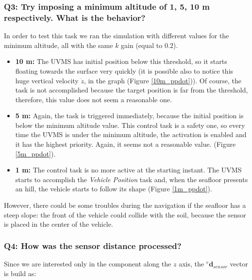 \documentclass{article}
\begin{document}

\subsubsection{Q3: Try imposing a minimum altitude of 1, 5, 10 m respectively. What is the behavior?}
In order to test this task we ran the simulation with different values for the minimum altitude, all with the same $k$ gain (equal to $0.2$).

\begin{itemize}
    \item \textbf{10 m:} The UVMS has initial position below this threshold, so it starts floating towards the surface very quickly (it is possible also to notice this huge vertical velocity $\dot{z}$, in the graph (Figure \ref{10m_ppdot})). 
    Of course, the task is not accomplished because the target position is far from the threshold, therefore, this value does not seem a reasonable one. %
    \item \textbf{5 m:} Again, the task is triggered immediately, because the initial position is below the minimum altitude value. This control task is a safety one, so every time the UVMS is under the minimum altitude, the activation is enabled and it has the highest priority. 
    Again, it seems not a reasonable value. (Figure \ref{5m_ppdot}).
    \item \textbf{1 m:} The control task is no more active at the starting instant. The UVMS starts to accomplish the \textit{Vehicle Position} task and, when the seafloor presents an hill, the vehicle starts to follow its shape (Figure \ref{1m_ppdot}). 
\end{itemize}
However, there could be some troubles during the navigation if the seafloor has a steep slope: the front of the vehicle could collide with the soil, because the sensor is placed in the center of the vehicle.


\subsubsection{Q4: How was the sensor distance processed?}
 
 Since we are interested only in the component along the $z$ axis, the $^{v}\boldsymbol{d}_{sensor}$ vector is build as:
 
\end{document}
